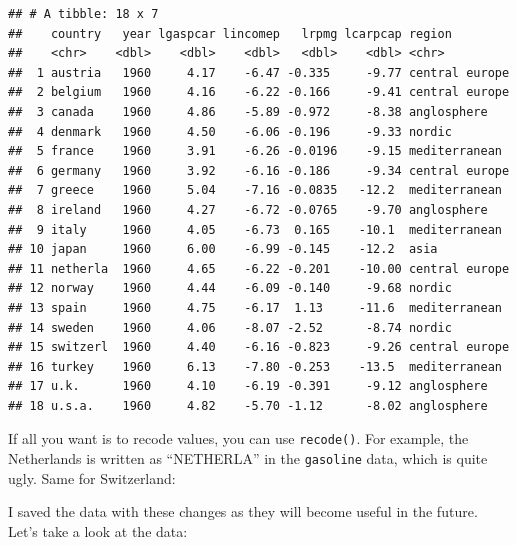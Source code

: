 \documentclass[]{gitbook}
\newenvironment{Shaded}{\begin{snugshade}}{\end{snugshade}}
\newcommand{\DataTypeTok}[1]{\textcolor[rgb]{0.13,0.29,0.53}{#1}}
\newcommand{\KeywordTok}[1]{\textcolor[rgb]{0.13,0.29,0.53}{\textbf{#1}}}
\newcommand{\NormalTok}[1]{#1}
\newcommand{\OperatorTok}[1]{\textcolor[rgb]{0.81,0.36,0.00}{\textbf{#1}}}
\newcommand{\StringTok}[1]{\textcolor[rgb]{0.31,0.60,0.02}{#1}}
\begin{document}
\begin{verbatim}
## # A tibble: 18 x 7
##    country   year lgaspcar lincomep   lrpmg lcarpcap region        
##    <chr>    <dbl>    <dbl>    <dbl>   <dbl>    <dbl> <chr>         
##  1 austria   1960     4.17    -6.47 -0.335     -9.77 central europe
##  2 belgium   1960     4.16    -6.22 -0.166     -9.41 central europe
##  3 canada    1960     4.86    -5.89 -0.972     -8.38 anglosphere   
##  4 denmark   1960     4.50    -6.06 -0.196     -9.33 nordic        
##  5 france    1960     3.91    -6.26 -0.0196    -9.15 mediterranean 
##  6 germany   1960     3.92    -6.16 -0.186     -9.34 central europe
##  7 greece    1960     5.04    -7.16 -0.0835   -12.2  mediterranean 
##  8 ireland   1960     4.27    -6.72 -0.0765    -9.70 anglosphere   
##  9 italy     1960     4.05    -6.73  0.165    -10.1  mediterranean 
## 10 japan     1960     6.00    -6.99 -0.145    -12.2  asia          
## 11 netherla  1960     4.65    -6.22 -0.201    -10.00 central europe
## 12 norway    1960     4.44    -6.09 -0.140     -9.68 nordic        
## 13 spain     1960     4.75    -6.17  1.13     -11.6  mediterranean 
## 14 sweden    1960     4.06    -8.07 -2.52      -8.74 nordic        
## 15 switzerl  1960     4.40    -6.16 -0.823     -9.26 central europe
## 16 turkey    1960     6.13    -7.80 -0.253    -13.5  mediterranean 
## 17 u.k.      1960     4.10    -6.19 -0.391     -9.12 anglosphere   
## 18 u.s.a.    1960     4.82    -5.70 -1.12      -8.02 anglosphere
\end{verbatim}

If all you want is to recode values, you can use \texttt{recode()}. For example, the Netherlands is
written as ``NETHERLA'' in the \texttt{gasoline} data, which is quite ugly. Same for Switzerland:

\begin{Shaded}
\end{Shaded}

I saved the data with these changes as they will become useful in the future. Let's take a look at
the data:
\end{document}
